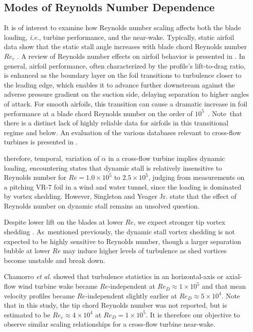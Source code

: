 \documentclass[energies,article,accept,moreauthors,pdftex,10pt,a4paper]{mdpi}
\theoremstyle{mdpi}
\newcounter{ex}
\newcounter{re}
\begin{document}
\subsection{Modes of Reynolds Number Dependence}

It is of interest to examine how Reynolds number scaling affects both the blade
loading, \emph{i.e.}, turbine performance, and the near-wake. Typically, static
airfoil data show that the static stall angle increases with blade chord
Reynolds number $Re_c$ \cite{Jacobs1937}. A review of Reynolds number effects on
airfoil behavior is presented in \cite{Lissaman1983}. In general, airfoil
performance, often characterized by the profile's lift-to-drag ratio, is
enhanced as the boundary layer on the foil transitions to turbulence closer to
the leading edge, which enables it to advance further downstream against the
adverse pressure gradient on the suction side, delaying separation to higher
angles of attack. For smooth airfoils, this transition can cause a dramatic
increase in foil performance at a blade chord Reynolds number on the order of
\mbox{$10^5$ \cite{McMasters1980}}. Note~that there is a distinct lack of highly
reliable data for airfoils in this transitional regime and below. An evaluation
of the various databases relevant to cross-flow turbines is presented in
\cite{Bedon2014}.

 therefore, temporal, variation of
$\alpha$ in a cross-flow turbine implies dynamic loading, encountering
 states that
dynamic stall is relatively insensitive to Reynolds number for $Re=1.0 \times
10^5$ to $2.5 \times 10^5$, judging from measurements on a pitching VR-7 foil in
a wind and water tunnel, since the loading is dominated by vortex shedding.
However, Singleton and Yeager Jr. \cite{Singleton2000} state that the effect of
Reynolds number on dynamic stall remains an unsolved question.

Despite lower lift on the blades at lower $Re$, we expect stronger tip vortex
shedding \cite{Yoon2005}. As~mentioned previously, the dynamic stall vortex
shedding is not expected to be highly sensitive to Reynolds number, though a
larger separation bubble at lower $Re$ may induce higher levels of turbulence as
shed vortices become unstable and break down.

Chamorro \emph{et al.} \cite{Chamorro2012} showed that turbulence statistics in
an horizontal-axis or axial-flow wind turbine wake became $Re$-independent at
$Re_D \approx 1 \times 10^5$ and that mean velocity profiles became
$Re$-independent slightly earlier at $Re_D \approx 5 \times 10^4$. Note that in
this study, the tip chord Reynolds number was not reported, but is estimated to
be $Re_c \approx 4 \times 10^4$ at $Re_D=1 \times 10^5$. It is therefore our
objective to observe similar scaling relationships for a cross-flow turbine
near-wake.
\end{document}
